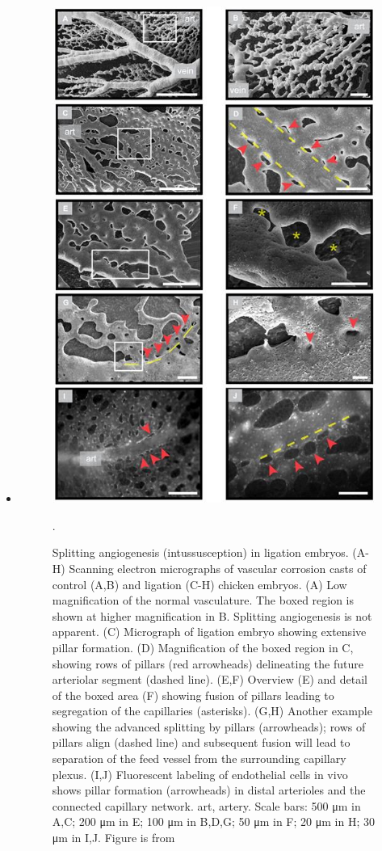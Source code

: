 \begin{itemize}
	\item 
	\begin{figure}
		\centering
		\includegraphics[width=0.5\linewidth]{images/pillarFormationInEmbryoLigation}
		\caption{Splitting angiogenesis (intussusception) in ligation embryos. (A-H) Scanning electron micrographs of vascular corrosion casts of control (A,B) and ligation (C-H) chicken embryos. (A) Low magnification of the normal vasculature. The boxed region is shown at higher magnification in B. Splitting angiogenesis is not apparent. (C) Micrograph of ligation embryo showing extensive pillar formation. (D) Magnification of the boxed region in C, showing rows of pillars (red arrowheads) delineating the future arteriolar segment (dashed line). (E,F) Overview (E) and detail of the boxed area (F) showing fusion of pillars leading to segregation of the capillaries (asterisks). (G,H) Another example showing the advanced splitting by pillars (arrowheads); rows of pillars align (dashed line) and subsequent fusion will lead to separation of the feed vessel from the surrounding capillary plexus. (I,J) Fluorescent labeling of endothelial cells in vivo shows pillar formation (arrowheads) in distal arterioles and the connected capillary network. art, artery. Scale bars: 500 μm in A,C; 200 μm in E; 100 μm in B,D,G; 50 μm in F; 20 μm in H; 30 μm in I,J. Figure is from \cite{Buschmann2010}}.
	\end{figure}
	
\end{itemize}


